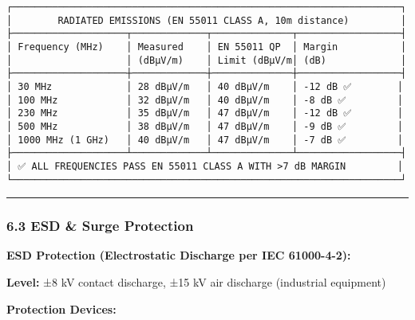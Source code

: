 \documentclass[
]{article}
\begin{document}
\begin{verbatim}
┌────────────────────────────────────────────────────────────────────┐
│        RADIATED EMISSIONS (EN 55011 CLASS A, 10m distance)         │
├────────────────────┬─────────────┬──────────────┬──────────────────┤
│ Frequency (MHz)    │ Measured    │ EN 55011 QP  │ Margin           │
│                    │ (dBμV/m)    │ Limit (dBμV/m│ (dB)             │
├────────────────────┼─────────────┼──────────────┼──────────────────┤
│ 30 MHz             │ 28 dBμV/m   │ 40 dBμV/m    │ -12 dB ✅        │
│ 100 MHz            │ 32 dBμV/m   │ 40 dBμV/m    │ -8 dB ✅         │
│ 230 MHz            │ 35 dBμV/m   │ 47 dBμV/m    │ -12 dB ✅        │
│ 500 MHz            │ 38 dBμV/m   │ 47 dBμV/m    │ -9 dB ✅         │
│ 1000 MHz (1 GHz)   │ 40 dBμV/m   │ 47 dBμV/m    │ -7 dB ✅         │
├────────────────────┴─────────────┴──────────────┴──────────────────┤
│ ✅ ALL FREQUENCIES PASS EN 55011 CLASS A WITH >7 dB MARGIN         │
└────────────────────────────────────────────────────────────────────┘
\end{verbatim}

\begin{center}\rule{0.5\linewidth}{0.5pt}\end{center}

\hypertarget{esd-surge-protection}{%
\subsubsection{6.3 ESD \& Surge Protection}\label{esd-surge-protection}}

\textbf{ESD Protection (Electrostatic Discharge per IEC 61000-4-2):}

\textbf{Level:} ±8 kV contact discharge, ±15 kV air discharge
(industrial equipment)

\textbf{Protection Devices:}
\end{document}
